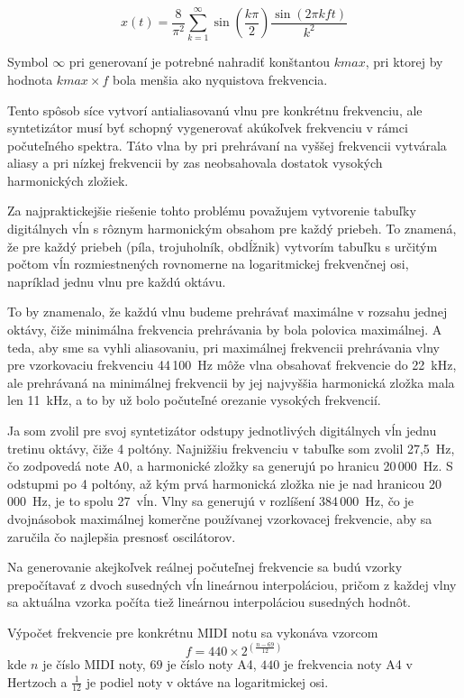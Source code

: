 \begin{equation*}
x(t) = \frac{8}{\pi^2} \sum_{k=1}^\infty \sin \left( \frac{k \pi}{2}\right) \frac{\sin(2\pi k f t)}{k^2}
\end{equation*}
\vspace{5mm}


Symbol $\infty$ pri generovaní je potrebné nahradiť konštantou $kmax$, pri ktorej by hodnota $kmax \times f$ bola menšia ako nyquistova frekvencia.

Tento spôsob síce vytvorí antialiasovanú vlnu pre konkrétnu frekvenciu, ale syntetizátor musí byť schopný vygenerovať akúkoľvek frekvenciu v rámci počuteľného spektra. Táto vlna by pri prehrávaní na vyššej frekvencii vytvárala aliasy a pri nízkej frekvencii by zas neobsahovala dostatok vysokých harmonických zložiek. 

Za najpraktickejšie riešenie tohto problému považujem vytvorenie tabuľky digitálnych vĺn s rôznym harmonickým obsahom pre každý priebeh. To znamená, že pre každý priebeh (píla, trojuholník, obdĺžnik) vytvorím tabuľku s určitým počtom vĺn rozmiestnených rovnomerne na logaritmickej frekvenčnej osi, napríklad jednu vlnu pre každú oktávu.

To by znamenalo, že každú vlnu budeme prehrávať maximálne v rozsahu jednej oktávy, čiže minimálna frekvencia prehrávania by bola polovica maximálnej. A teda, aby sme sa vyhli aliasovaniu, pri maximálnej frekvencii prehrávania vlny  pre vzorkovaciu frekvenciu 44\,100~Hz môže vlna obsahovať frekvencie do 22~kHz, ale prehrávaná na minimálnej frekvencii by jej najvyššia harmonická zložka mala len 11~kHz, a to by už bolo počuteľné orezanie vysokých frekvencií.

Ja som zvolil pre svoj syntetizátor odstupy jednotlivých digitálnych vĺn jednu tretinu oktávy, čiže 4 poltóny. Najnižšiu frekvenciu v tabuľke som zvolil 27,5~Hz, čo zodpovedá note A0, a harmonické zložky sa generujú po hranicu 20\,000~Hz. S odstupmi po 4 poltóny, až kým prvá harmonická zložka nie je nad hranicou 20\,000~Hz, je to spolu 27~vĺn. Vlny sa generujú v rozlíšení 384\,000~Hz, čo je dvojnásobok maximálnej komerčne používanej vzorkovacej frekvencie, aby sa zaručila čo najlepšia presnosť oscilátorov. 

Na generovanie akejkoľvek reálnej počuteľnej frekvencie sa budú vzorky prepočítavať z dvoch susedných vĺn lineárnou interpoláciou, pričom z každej vlny sa aktuálna vzorka počíta tiež lineárnou interpoláciou susedných hodnôt.

Výpočet frekvencie pre konkrétnu MIDI notu sa vykonáva vzorcom
\begin{equation*}
f = 440 \times 2^{\left(\frac{n-69}{12}\right)}
\end{equation*}
kde $n$ je číslo MIDI noty, $69$ je číslo noty A4, $440$ je frekvencia noty A4 v Hertzoch a $\frac{1}{12}$ je podiel noty v oktáve na logaritmickej osi.

